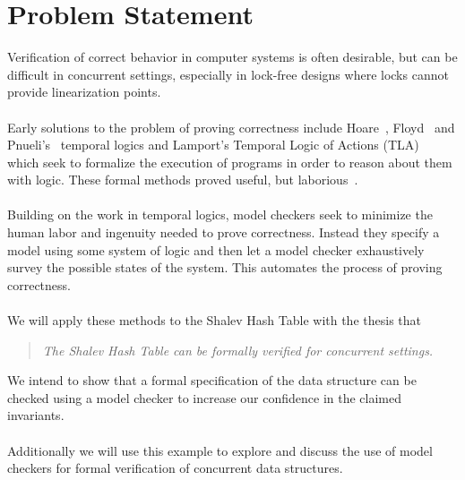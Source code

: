 \documentclass{uit-thesis}
\begin{document}
\section{Problem Statement}\label{sec:problem-statement}
Verification of correct behavior in computer systems is often desirable, but can be difficult in concurrent settings, especially in lock-free designs where locks cannot provide linearization points. 
\\\\
Early solutions to the problem of proving correctness include Hoare~\cite{Hoare1969}, Floyd~\cite{Floyd1967} and Pnueli's~\cite{Pnueli1977} temporal logics and Lamport's Temporal Logic of Actions (TLA)~\cite{Lamport1977} which seek to formalize the execution of programs in order to reason about them with logic. These formal methods proved useful, but laborious~\cite{Clarke2009}.
\\\\
Building on the work in temporal logics, model checkers seek to minimize the human labor and ingenuity needed to prove correctness. Instead they specify a model using some system of logic and then let a model checker exhaustively survey the possible states of the system. This automates the process of proving correctness.
\\\\
We will apply these methods to the Shalev Hash Table with the thesis that
\begin{quote}
    \emph{The Shalev Hash Table can be formally verified for concurrent settings.}
\end{quote}
We intend to show that a formal specification of the data structure can be checked using a model checker to increase our confidence in the claimed invariants.
\\\\
Additionally we will use this example to explore and discuss the use of model checkers for formal verification of concurrent data structures.
\end{document}
